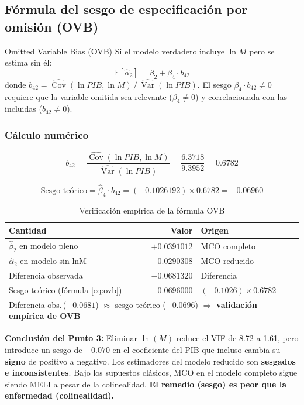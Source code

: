 \documentclass[12pt,a4paper]{article}
\newcommand\E{\mathbb{E}}
\newcommand\Var{\operatorname{Var}}
\newcommand\Cov{\operatorname{Cov}}
\begin{document}
\subsection{Fórmula del sesgo de especificación por omisión (OVB)}

\begin{frmbox}{Omitted Variable Bias (OVB)}
Si el modelo verdadero incluye $\ln M$ pero se estima sin él:
\begin{equation}
\E[\hat\alpha_2] = \beta_2 + \beta_4\cdot b_{42}
\label{eq:ovb}
\end{equation}
donde $b_{42}=\widehat{\Cov}(\ln PIB,\ln M)\,/\,\widehat{\Var}(\ln PIB)$.
El sesgo $\beta_4\cdot b_{42}\neq0$ requiere que la variable omitida sea
relevante ($\beta_4\neq0$) y correlacionada con las incluidas ($b_{42}\neq0$).
\end{frmbox}

\subsubsection{Cálculo numérico}

\[b_{42}=\frac{\widehat{\Cov}(\ln PIB,\ln M)}{\widehat{\Var}(\ln PIB)}
=\frac{6.3718}{9.3952}=0.6782\]

\[\text{Sesgo teórico}=\hat\beta_4\cdot b_{42}=(-0.1026192)\times0.6782=\mathbf{-0.06960}\]

\begin{table}[H]\centering
\caption{Verificación empírica de la fórmula OVB}
\begin{tabular}{lrl}
\toprule
Cantidad & Valor & Origen\\
\midrule
$\hat\beta_2$ en modelo pleno & $+0.0391012$ & MCO completo\\
$\hat\alpha_2$ en modelo sin lnM & $-0.0290308$ & MCO reducido\\
Diferencia observada & $-0.0681320$ & Diferencia\\
Sesgo teórico (fórmula \ref{eq:ovb}) & $-0.0696000$ & $(-0.1026)\times 0.6782$\\
\midrule
\multicolumn{3}{l}{\small Diferencia obs.\,($-0.0681$) $\approx$ sesgo teórico ($-0.0696$)
$\Rightarrow$ \textbf{validación empírica de OVB}}\\
\bottomrule
\end{tabular}
\end{table}

\begin{alertbox}
\textbf{Conclusión del Punto 3:} Eliminar $\ln(M)$ reduce el VIF de 8.72 a 1.61,
pero introduce un sesgo de $-0.070$ en el coeficiente del PIB que incluso cambia
su \textbf{signo} de positivo a negativo. Los estimadores del modelo reducido son
\textbf{sesgados e inconsistentes}. Bajo los supuestos clásicos, MCO en el modelo
completo sigue siendo MELI a pesar de la colinealidad.
\textbf{El remedio (sesgo) es peor que la enfermedad (colinealidad).}
\end{alertbox}
\end{document}
